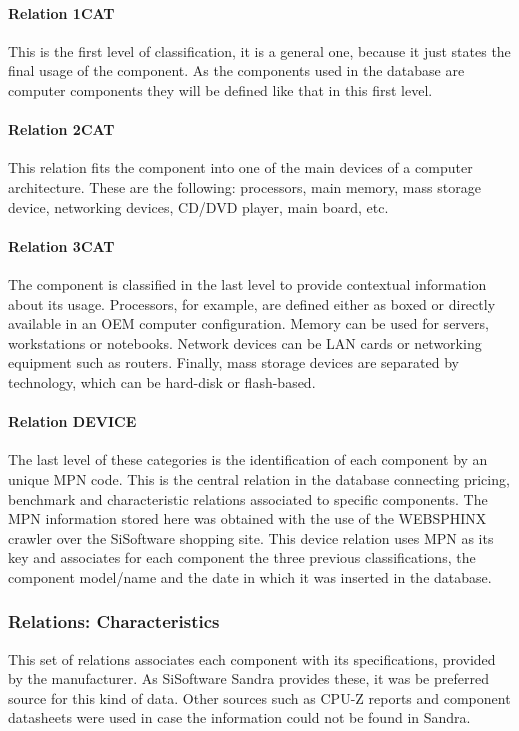         \paragraph*{Relation 1CAT}%
            This is the first level of classification, it is a general one, because it just states the final usage of the component. As the components used in the database are computer components they will be defined like that in this first level.

        \paragraph*{Relation 2CAT}
            This relation fits the component into one of the main devices of a computer architecture. These are the following: processors, main memory, mass storage device, networking devices, CD/DVD player, main board, etc.

        \paragraph*{Relation 3CAT}
            The component is classified in the last level to provide contextual information about its usage. Processors, for example, are defined either as boxed or directly available in an OEM computer configuration. Memory can be used for servers, workstations or notebooks. Network devices can be LAN cards or networking equipment such as routers. Finally, mass storage devices are separated by technology, which can be hard-disk or flash-based.

        \paragraph*{Relation DEVICE}
            The last level of these categories is the identification of each component by an unique MPN code. This is the central relation in the database connecting pricing, benchmark and characteristic relations associated to specific components. The MPN information stored here was obtained with the use of the WEBSPHINX crawler over the SiSoftware shopping site. This device relation uses MPN as its key and associates for each component the three previous classifications, the component model/name and the date in which it was inserted in the database.
            
    \subsubsection*{Relations: Characteristics}
        This set of relations associates each component with its specifications, provided by the manufacturer. As SiSoftware Sandra provides these, it was be preferred source for this kind of data. Other sources such as CPU-Z reports and component datasheets were used in case the information could not be found in Sandra.


